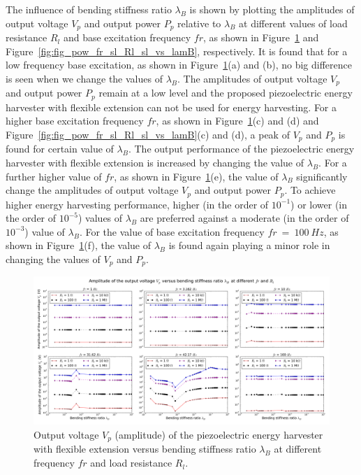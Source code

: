 \documentclass{elsarticle}
\begin{document}
The influence of bending stiffness ratio $\lambda_B$ is shown by plotting the amplitudes of output voltage $V_p$ and output power $P_p$ relative to $\lambda_B$ at different values of load resistance $R_l$ and base excitation frequency $fr$, as shown in Figure~\ref{fig:fig_vol_fr_sl_Rl_sl_vs_lamB} and Figure~\ref{fig:fig_pow_fr_sl_Rl_sl_vs_lamB}, respectively. It is found that for a low frequency base excitation, as shown in Figure~\ref{fig:fig_vol_fr_sl_Rl_sl_vs_lamB}(a) and (b), no big difference is seen when we change the values of $\lambda_B$. The amplitudes of output voltage $V_p$ and output power $P_p$ remain at a low level and the proposed piezoelectric energy harvester with flexible extension can not be used for energy harvesting. For a higher base excitation frequency $fr$, as shown in Figure~\ref{fig:fig_vol_fr_sl_Rl_sl_vs_lamB}(c) and (d) and Figure~\ref{fig:fig_pow_fr_sl_Rl_sl_vs_lamB}(c) and (d), a peak of $V_p$ and $P_p$ is found for certain value of $\lambda_B$. The output performance of the piezoelectric energy harvester with flexible extension is increased by changing the value of $\lambda_B$. For a further higher value of $fr$, as shown in Figure~\ref{fig:fig_vol_fr_sl_Rl_sl_vs_lamB}(e), the value of $\lambda_B$ significantly change the amplitudes of output voltage $V_p$ and output power $P_p$. To achieve higher energy harvesting performance, higher (in the order of $10^{-1}$) or lower (in the order of $10^{-5}$) values of $\lambda_B$ are preferred against a moderate (in the order of $10^{-3}$) value of $\lambda_B$. For the value of base excitation frequency $fr\ =\ 100\ Hz$, as shown in Figure~\ref{fig:fig_vol_fr_sl_Rl_sl_vs_lamB}(f), the value of $\lambda_B$ is found again playing a minor role in changing the values of $V_p$ and $P_p$.



\begin{figure}[!htbp]
    \centering
    \includegraphics[width=\textwidth]{./fig_vol_fr_sl_Rl_sl_vs_lamB}
    \caption{Output voltage $V_p$ (amplitude) of the piezoelectric energy harvester with flexible extension versus bending stiffness ratio $\lambda_B$ at different frequency $fr$ and load resistance $R_l$. }
    \label{fig:fig_vol_fr_sl_Rl_sl_vs_lamB}
\end{figure}
\end{document}
